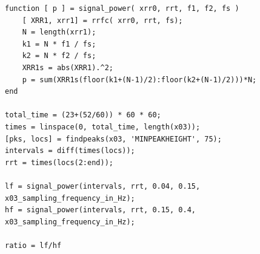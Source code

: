 \documentclass{article}
\begin{document}
\begin{enumerate}
\begin{lstlisting}
function [ p ] = signal_power( xrr0, rrt, f1, f2, fs )
    [ XRR1, xrr1] = rrfc( xrr0, rrt, fs);
    N = length(xrr1);
    k1 = N * f1 / fs;
    k2 = N * f2 / fs;
    XRR1s = abs(XRR1).^2;
    p = sum(XRR1s(floor(k1+(N-1)/2):floor(k2+(N-1)/2)))*N;
end

total_time = (23+(52/60)) * 60 * 60;
times = linspace(0, total_time, length(x03));
[pks, locs] = findpeaks(x03, 'MINPEAKHEIGHT', 75);
intervals = diff(times(locs));
rrt = times(locs(2:end));

lf = signal_power(intervals, rrt, 0.04, 0.15, x03_sampling_frequency_in_Hz);
hf = signal_power(intervals, rrt, 0.15, 0.4, x03_sampling_frequency_in_Hz);

ratio = lf/hf
\end{lstlisting}

\end{enumerate}
\end{document}
